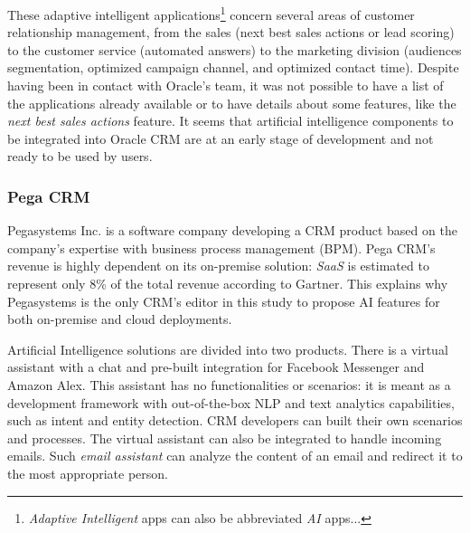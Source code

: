 These adaptive intelligent applications\footnote{\textit{Adaptive Intelligent} apps can also be abbreviated \textit{AI} apps...} concern several areas of customer relationship management, from the sales (next best sales actions or lead scoring) to the customer service (automated answers) to the marketing division (audiences segmentation, optimized campaign channel, and optimized contact time). Despite having been in contact with Oracle's team, it was not possible to have a list of the applications already available or to have details about some features, like the \textit{next best sales actions} feature. It seems that artificial intelligence components to be integrated into Oracle CRM are at an early stage of development and not ready to be used by users. 


\subsubsection*{Pega CRM}
Pegasystems Inc. is a software company developing a CRM product based on the company's expertise with business process management (BPM). Pega CRM's revenue is highly dependent on its on-premise solution: \textit{SaaS} is estimated to represent only 8\% of the total revenue according to Gartner. This explains why Pegasystems is the only CRM's editor in this study to propose AI features for both on-premise and cloud deployments.

Artificial Intelligence solutions are divided into two products. There is a virtual assistant with a chat and pre-built integration for Facebook Messenger and Amazon Alex. This assistant has no functionalities or scenarios: it is meant as a development framework with out-of-the-box NLP and text analytics capabilities, such as intent and entity detection. CRM developers can built their own scenarios and processes. The virtual assistant can also be integrated to handle incoming emails. Such \textit{email assistant} can analyze the content of an email and redirect it to the most appropriate person.

